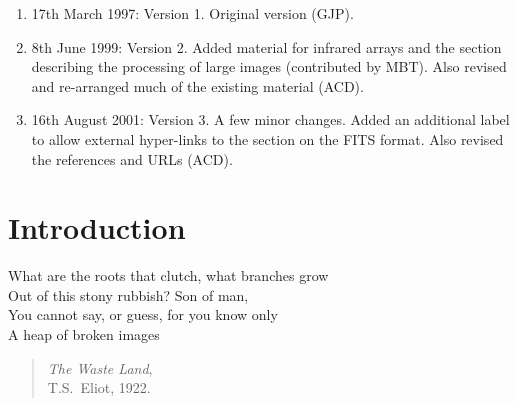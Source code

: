 \documentclass[twoside,11pt]{starlink}
\begin{document}
\scfrontmatter


\begin{enumerate}

  \item 17th March 1997: Version 1. Original version (GJP).

  \item 8th June 1999: Version 2. Added material for infrared arrays
  and the section describing the processing of large images
  (contributed by MBT).  Also revised and re-arranged much of the
  existing material (ACD).

  \item 16th August 2001: Version 3.  A few minor changes.  Added an
  additional label to allow external hyper-links to the section on the
  FITS format.  Also revised the references and URLs (ACD).

\end{enumerate}

\section{\label{INTRO}Introduction}

\begin{center}
\begin{minipage}[t]{3.4in}
What are the roots that clutch, what branches grow \\
Out of this stony rubbish?  Son of man, \\
You cannot say, or guess, for you know only \\
A heap of broken images
\end{minipage}
\end{center}

\begin{latexonly}
\begin{quote}
\textit{The Waste Land},  \raggedleft \\
T.S.~Eliot, 1922.      \raggedleft
\end{quote}
\end{latexonly}
\end{document}
